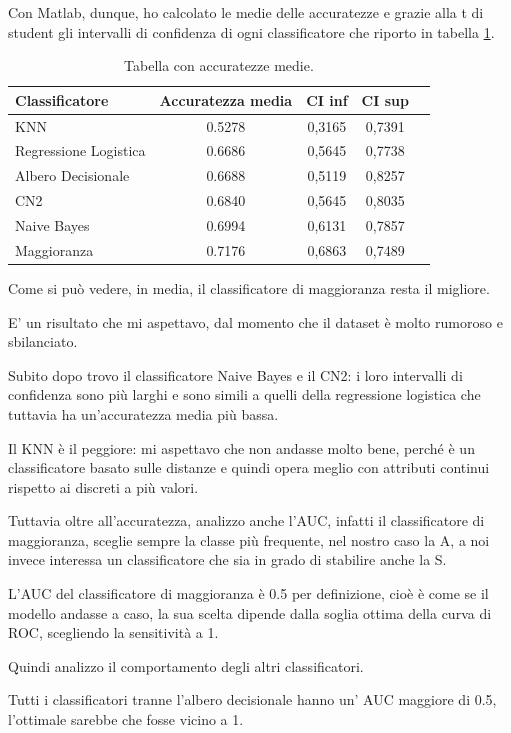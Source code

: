 \documentclass[a4paper, 12p]{report}
\begin{document}
Con Matlab, dunque,  ho calcolato le medie delle accuratezze e grazie alla t di student gli intervalli di confidenza di ogni classificatore che riporto in tabella \ref{tab:1}.
\begin{table}
\centering
\caption{Tabella con accuratezze medie.}
\label{tab:1}
\begin{tabular}{|l|c|c|c|l|}
\hline
Classificatore & Accuratezza media & CI inf  & CI sup\\
\hline
KNN & 0.5278 & 0,3165 & 0,7391\\
\hline
Regressione Logistica & 0.6686 & 0,5645 & 0,7738\\
\hline
Albero Decisionale & 0.6688 & 0,5119 & 0,8257\\
\hline
CN2 & 0.6840 & 0,5645 & 0,8035\\
\hline
Naive Bayes & 0.6994 & 0,6131 & 0,7857\\
\hline
Maggioranza & 0.7176 & 0,6863 & 0,7489\\
\hline

\end{tabular}
\end{table}

Come si può vedere, in media, il classificatore di maggioranza resta il migliore.

E' un risultato che mi aspettavo, dal momento che il dataset è molto rumoroso e sbilanciato. 

Subito dopo trovo il classificatore Naive Bayes e il CN2: i loro intervalli di confidenza sono più larghi e sono simili a quelli della regressione logistica che tuttavia ha un'accuratezza media più bassa.

 Il KNN è il peggiore: mi aspettavo che non andasse molto bene, perché è un classificatore basato sulle distanze e quindi opera meglio con attributi continui rispetto ai discreti a più valori.

Tuttavia oltre all'accuratezza, analizzo anche l'AUC, infatti il classificatore di maggioranza, sceglie sempre la classe più frequente, nel nostro caso la A, a noi invece interessa un classificatore che sia in grado di stabilire anche la S. 

L'AUC del classificatore di maggioranza è 0.5 per definizione, cioè è come se il modello andasse a caso, la sua scelta dipende dalla soglia ottima della curva di ROC, scegliendo la sensitività a 1.

\noindent Quindi analizzo il comportamento degli altri classificatori.

Tutti i classificatori tranne l'albero decisionale hanno un' AUC maggiore di 0.5, l'ottimale sarebbe che fosse vicino a 1. 
\end{document}
